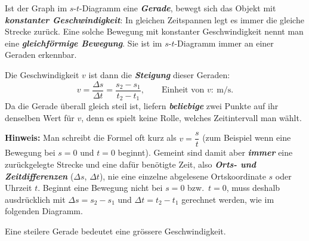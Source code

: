 \begin{theoriebox}
Ist der Graph im $s$-$t$-Diagramm eine \textbf{\emph{Gerade}}, bewegt sich das
Objekt mit \textbf{\emph{konstanter Geschwindigkeit}}: In gleichen Zeitspannen
legt es immer die gleiche Strecke zurück. Eine solche Bewegung mit
konstanter Geschwindigkeit nennt man eine \textbf{\emph{gleichförmige Bewegung}}.
Sie ist im $s$-$t$-Diagramm immer an einer Geraden erkennbar.

Die Geschwindigkeit $v$ ist dann die \textbf{\emph{Steigung}} dieser Geraden:
\[
  v = \frac{\Delta s}{\Delta t} = \frac{s_2 - s_1}{t_2 - t_1}, \qquad
  \text{Einheit von } v \colon\ \si{\meter\per\second}.
\]
Da die Gerade überall gleich steil ist, liefern \textbf{\emph{beliebige}} zwei
Punkte auf ihr denselben Wert für $v$, denn es spielt keine Rolle, welches
Zeitintervall man wählt.

\textbf{Hinweis:} Man schreibt die Formel oft kurz als $v = \dfrac{s}{t}$
(zum Beispiel wenn eine Bewegung bei $s=0$ und $t=0$ beginnt). Gemeint sind
damit aber \textbf{\emph{immer}} eine zurückgelegte Strecke und eine dafür benötigte
Zeit, also \textbf{\emph{Orts- und Zeitdifferenzen}} ($\Delta s$, $\Delta t$),
nie eine einzelne abgelesene Ortskoordinate $s$ oder Uhrzeit $t$. Beginnt
eine Bewegung nicht bei $s=0$ bzw.\ $t=0$, muss deshalb ausdrücklich mit
$\Delta s = s_2-s_1$ und $\Delta t = t_2-t_1$ gerechnet werden, wie im
folgenden Diagramm.

\begin{center}
\end{center}

\begin{center}
\end{center}

Eine steilere Gerade bedeutet eine grössere Geschwindigkeit.
\end{theoriebox}

